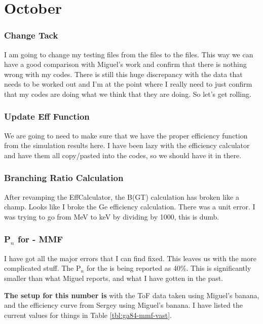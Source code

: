 \chapter{October}
\subsection{Change Tack}
I am going to change my testing files from the  files to the 
 files. This way we can have a good comparison with Miguel's work
and confirm that there is nothing wrong with my codes. There is still this 
huge discrepancy with the  data that needs to be worked out and
I'm at the point where I really need to just confirm that my codes are doing 
what we think that they are doing. So let's get rolling.

\subsection{Update Eff Function}
We are going to need to make sure that we have the proper efficiency function 
from the simulation results here. I have been lazy with the efficiency 
calculator and have them all copy/pasted into the codes, so we should have it 
in there.

\subsection{Branching Ratio Calculation}
After revamping the EffCalculator, the B(GT) calculation has broken like a 
champ. Looks like I broke the Ge efficiency calculation. There was a unit error. 
I was trying to go from MeV to keV by dividing by 1000, this is dumb.

\subsection{P$_n$ for  - MMF}
I have got all the major errors that I can find fixed. This leaves us with the 
more complicated stuff. The P$_n$ for the  is being reported as 
40\%. This is significantly smaller than what Miguel reports, and what I have
gotten in the past. 

\textbf{The setup for this number is } with the ToF data taken using Miguel's 
banana, and the efficiency curve from Sergey using Miguel's banana. I have 
listed the current values for things in Table \ref{tbl:ga84-mmf-vast}.


